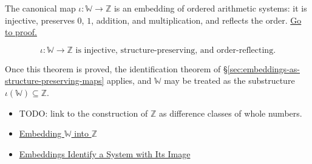 \begin{tcolorbox}[colback=thmbox, colframe=thmborder, arc=2pt,
  left=6pt, right=6pt, top=4pt, bottom=4pt,
  title={\small\textbf{Theorem ($\mathbb{W}$ Embeds in $\mathbb{Z}$)}},
  fonttitle=\small\bfseries]
\begin{theorem}
\label{thm:w-embeds-in-z}
The canonical map $\iota:\mathbb{W}\to \mathbb{Z}$ is an embedding of ordered arithmetic systems: it is injective, preserves $0$, $1$, addition, and multiplication, and reflects the order.
\hyperref[prf:w-embeds-in-z]{Go to proof.}
\end{theorem}
\end{tcolorbox}
\begin{remark*}
\[
\iota:\mathbb{W}\to \mathbb{Z} \text{ is injective, structure-preserving, and order-reflecting.}
\]
\end{remark*}
\begin{remark*}[Interpretation]
Once this theorem is proved, the identification theorem of \S\ref{sec:embeddings-as-structure-preserving-maps} applies, and $\mathbb{W}$ may be treated as the substructure $\iota(\mathbb{W})\subseteq \mathbb{Z}$.
\end{remark*}
\begin{dependencies}
\begin{itemize}
  \item TODO: link to the construction of $\mathbb{Z}$ as difference classes of whole numbers.
  \item \hyperref[def:embedding-w-into-z]{Embedding $\mathbb{W}$ into $\mathbb{Z}$}
  \item \hyperref[thm:embedding-identifies-with-image]{Embeddings Identify a System with Its Image}
\end{itemize}
\end{dependencies}

